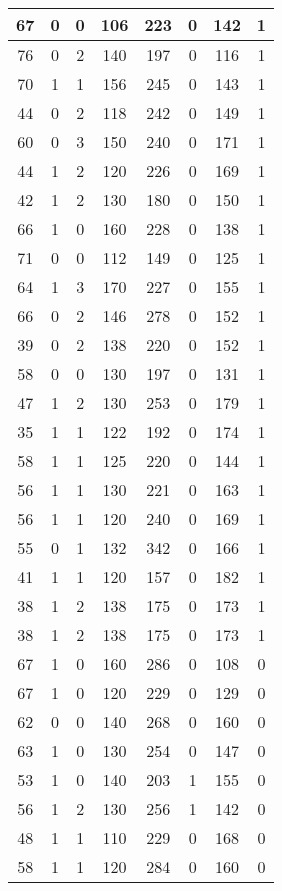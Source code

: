 \documentclass{article}
\begin{document}
\begin{longtable}{|c|c|c|c|c|c|c|c|}
67 & 0 & 0 & 106 & 223 & 0 & 142 & 1 \\ \hline
76 & 0 & 2 & 140 & 197 & 0 & 116 & 1 \\ \hline
70 & 1 & 1 & 156 & 245 & 0 & 143 & 1 \\ \hline
44 & 0 & 2 & 118 & 242 & 0 & 149 & 1 \\ \hline
60 & 0 & 3 & 150 & 240 & 0 & 171 & 1 \\ \hline
44 & 1 & 2 & 120 & 226 & 0 & 169 & 1 \\ \hline
42 & 1 & 2 & 130 & 180 & 0 & 150 & 1 \\ \hline
66 & 1 & 0 & 160 & 228 & 0 & 138 & 1 \\ \hline
71 & 0 & 0 & 112 & 149 & 0 & 125 & 1 \\ \hline
64 & 1 & 3 & 170 & 227 & 0 & 155 & 1 \\ \hline
66 & 0 & 2 & 146 & 278 & 0 & 152 & 1 \\ \hline
39 & 0 & 2 & 138 & 220 & 0 & 152 & 1 \\ \hline
58 & 0 & 0 & 130 & 197 & 0 & 131 & 1 \\ \hline
47 & 1 & 2 & 130 & 253 & 0 & 179 & 1 \\ \hline
35 & 1 & 1 & 122 & 192 & 0 & 174 & 1 \\ \hline
58 & 1 & 1 & 125 & 220 & 0 & 144 & 1 \\ \hline
56 & 1 & 1 & 130 & 221 & 0 & 163 & 1 \\ \hline
56 & 1 & 1 & 120 & 240 & 0 & 169 & 1 \\ \hline
55 & 0 & 1 & 132 & 342 & 0 & 166 & 1 \\ \hline
41 & 1 & 1 & 120 & 157 & 0 & 182 & 1 \\ \hline
38 & 1 & 2 & 138 & 175 & 0 & 173 & 1 \\ \hline
38 & 1 & 2 & 138 & 175 & 0 & 173 & 1 \\ \hline
67 & 1 & 0 & 160 & 286 & 0 & 108 & 0 \\ \hline
67 & 1 & 0 & 120 & 229 & 0 & 129 & 0 \\ \hline
62 & 0 & 0 & 140 & 268 & 0 & 160 & 0 \\ \hline
63 & 1 & 0 & 130 & 254 & 0 & 147 & 0 \\ \hline
53 & 1 & 0 & 140 & 203 & 1 & 155 & 0 \\ \hline
56 & 1 & 2 & 130 & 256 & 1 & 142 & 0 \\ \hline
48 & 1 & 1 & 110 & 229 & 0 & 168 & 0 \\ \hline
58 & 1 & 1 & 120 & 284 & 0 & 160 & 0 \\ \hline

\end{longtable}
\end{document}

